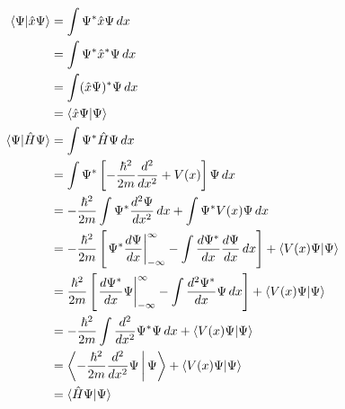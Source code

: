 \documentclass{article}
\begin{document}
\begin{enumerate}
        \begin{align*}
          \braket{\Psi | \hat{x} \Psi} & = \int \Psi^* \hat{x} \Psi \,d x                                                                                                                                                 \\
                                       & = \int \Psi^* \hat{x}^* \Psi \,d x                                                                                                                                               \\
                                       & = \int (\hat{x} \Psi)^* \Psi \,d x                                                                                                                                               \\
                                       & = \braket{\hat{x} \Psi | \Psi}                                                                                                                                                   \\
          \braket{\Psi | \hat{H} \Psi} & = \int \Psi^* \hat{H} \Psi \,d x                                                                                                                                                 \\
                                       & = \int \Psi^* \left[ -\frac{\hbar^2}{2 m} \frac{d^2}{d x^2} + V(x) \right] \Psi \,d x                                                                                            \\
                                       & = -\frac{\hbar^2}{2 m} \int \Psi^* \frac{d^2 \Psi}{d x^2} \,d x + \int \Psi^* V(x) \Psi \,d x                                                                                    \\
                                       & = -\frac{\hbar^2}{2 m} \left[ \left. \Psi^* \frac{d \Psi}{d x} \right|_{-\infty}^\infty - \int \frac{d \Psi^*}{d x} \frac{d \Psi}{d x} \,d x \right] + \braket{V(x) \Psi | \Psi} \\
                                       & = \frac{\hbar^2}{2 m} \left[ \left. \frac{d \Psi^*}{d x} \Psi \right|_{-\infty}^\infty - \int \frac{d^2 \Psi^*}{d x} \Psi \,d x \right] + \braket{V(x) \Psi | \Psi}              \\
                                       & = -\frac{\hbar^2}{2 m} \int \frac{d^2}{d x^2} \Psi^* \Psi \,d x + \braket{V(x) \Psi | \Psi}                                                                                      \\
                                       & = \Braket{-\frac{\hbar^2}{2 m} \frac{d^2}{d x^2} \Psi | \Psi} + \braket{V(x) \Psi | \Psi}                                                                                        \\
                                       & = \braket{\hat{H} \Psi | \Psi}
        \end{align*}
\end{enumerate}
\end{document}
